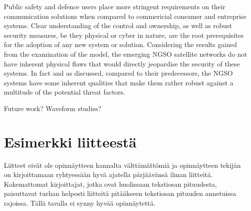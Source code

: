 \documentclass[english, 12pt, a4paper, elec, utf8, a-1b, online]{aaltothesis}
\begin{document}
Public safety and defence users place more stringent requirements on their communication solutions when compared to commericial consumer and entreprise systems. Clear understanding of the control and ownership, as well as robust security measures, be they physical or cyber in nature, are the root prerequisites for the adoption of any new system or solution. Considering the results gained from the examination of the model, the emerging NGSO satellite networks do not have inherent physical flaws that would directly jeopardise the security of these systems. In fact and as discussed, compared to their predecessors, the NGSO systems have some inherent qualities that make them rather robust against a multitude of the potential threat factors.

Future work? Waveform studies?







\clearpage

\thesisbibliography




\clearpage

\thesisappendix

\section{Esimerkki liitteest\"a\label{LiiteA}}

Liitteet eiv\"at ole opinn\"aytteen kannalta v\"altt\"am\"att\"omi\"a ja 
opinn\"aytteen tekij\"an on 
kirjoittamaan ryhtyess\"a\"an hyv\"a ajatella p\"arj\"a\"av\"ans\"a ilman liitteit\"a.
Kokemattomat kirjoittajat, jotka ovat huolissaan
tekstiosan pituudesta, paisuttavat turhan 
helposti liitteit\"a pit\"a\"akseen tekstiosan pituuden annetuissa rajoissa.
T\"all\"a tavalla ei synny hyv\"a\"a opinn\"aytett\"a.
\end{document}
